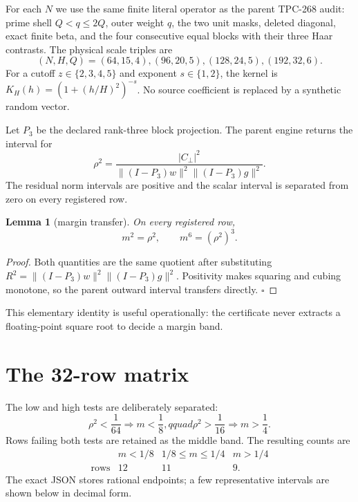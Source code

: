 \documentclass[11pt]{article}
\newcommand{\Cperp}{C_{\perp}}
\newcommand{\marg}{m}
\newtheorem{lemma}{Lemma}
\begin{document}
For each \(N\) we use the same finite literal operator as the parent
TPC-268 audit: prime shell \(Q<q\leq2Q\), outer weight \(q\), the two unit
masks, deleted diagonal, exact finite beta, and the four consecutive equal
blocks with their three Haar contrasts.  The physical scale triples are
\[
 (N,H,Q)=(64,15,4),(96,20,5),(128,24,5),(192,32,6).
\]
For a cutoff \(z\in\{2,3,4,5\}\) and exponent \(s\in\{1,2\}\), the kernel
is \(K_H(h)=(1+(h/H)^2)^{-s}\).  No source coefficient is replaced by a
synthetic random vector.

Let \(P_3\) be the declared rank-three block projection.  The parent engine
returns the interval for
\[
 \rho^2=\frac{|\Cperp|^2}{\|(I-P_3)w\|^2\|(I-P_3)g\|^2}.
\]
The residual norm intervals are positive and the scalar interval is separated
from zero on every registered row.

\begin{lemma}[margin transfer]
On every registered row,
\[
 \marg^2=\rho^2,\qquad \marg^6=(\rho^2)^3.
\]
\end{lemma}

\begin{proof}
Both quantities are the same quotient after substituting
\(R^2=\|(I-P_3)w\|^2\|(I-P_3)g\|^2\).  Positivity makes squaring and cubing
monotone, so the parent outward interval transfers directly.  \(\square\)
\end{proof}

This elementary identity is useful operationally: the certificate never
extracts a floating-point square root to decide a margin band.

\section{The 32-row matrix}

The low and high tests are deliberately separated:
\[
 \rho^2<\frac1{64}\Longrightarrow m<\frac18,qquad
 \rho^2>\frac1{16}\Longrightarrow m>\frac14.
\]
Rows failing both tests are retained as the middle band.  The resulting
counts are
\[
 \begin{array}{c|ccc}
  &m<1/8&1/8\leq m\leq1/4&m>1/4\\ \hline
  \text{rows}&12&11&9.
 \end{array}
\]
The exact JSON stores rational endpoints; a few representative intervals are
shown below in decimal form.
\end{document}
